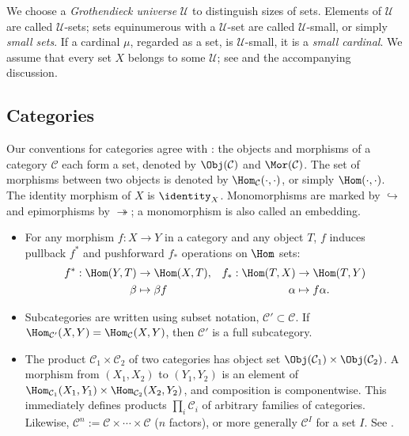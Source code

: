 We choose a \emph{Grothendieck universe}
 $\mathcal U$ to distinguish sizes of sets. Elements of $\mathcal U$ are called $\mathcal U$-sets; sets equinumerous with a $\mathcal U$-set are called $\mathcal U$-small, or simply \emph{small sets}. If a cardinal $\mu$, regarded as a set, is $\mathcal U$-small, it is a \emph{small cardinal}. We assume that every set $X$ belongs to some $\mathcal U$; see \cite[Assumption~1.5.2]{Li1} and the accompanying discussion.

\subsection*{Categories}

Our conventions for categories agree with \cite[\S~1.5, Definition~2.1.3]{Li1}: the objects and morphisms of a category $\mathcal C$ each form a set, denoted by $\Obj(\mathcal C)$ and $\Mor(\mathcal C)$. The set of morphisms between two objects is denoted by $\Hom_{\mathcal C}(\cdot,\cdot)$, or simply $\Hom(\cdot,\cdot)$. The identity morphism of $X$ is $\identity_X$. Monomorphisms are marked by $\hookrightarrow$ and epimorphisms by $\twoheadrightarrow$; a monomorphism is also called an embedding.

\begin{itemize}
	\item For any morphism $f:X\to Y$ in a category and any object $T$, $f$ induces pullback $f^*$ and pushforward $f_*$ operations on $\Hom$ sets:
	\begin{align*}
		f^*: \Hom(Y, T) & \to \Hom(X, T), & f_*: \Hom(T, X) & \to \Hom(T, Y) \\
		\beta & \mapsto \beta f & \alpha & \mapsto f\alpha .
	\end{align*}
	\item Subcategories are written using subset notation, $\mathcal C'\subset\mathcal C$. If $\Hom_{\mathcal C'}(X,Y)=\Hom_{\mathcal C}(X,Y)$, then $\mathcal C'$ is a full subcategory.

	\item The product $\mathcal C_1\times\mathcal C_2$ of two categories has object set $\Obj(\mathcal C_1)\times\Obj(\mathcal C_2)$. A morphism from $(X_1,X_2)$ to $(Y_1,Y_2)$ is an element of $\Hom_{\mathcal C_1}(X_1,Y_1)\times\Hom_{\mathcal C_2}(X_2,Y_2)$, and composition is componentwise. This immediately defines products $\prod_i\mathcal C_i$ of arbitrary families of categories. Likewise, $\mathcal C^n:=\mathcal C\times\cdots\times\mathcal C$ ($n$ factors), or more generally $\mathcal C^I$ for a set $I$. See \cite[Definition~2.3.1]{Li1}.
\end{itemize}

